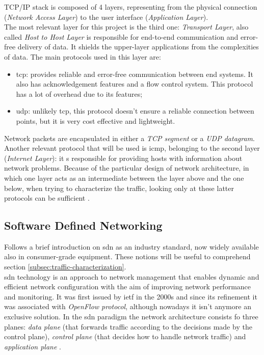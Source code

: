 TCP/IP stack is composed of 4 layers, representing from the physical connection (\textit{Network Access Layer}) to the user interface (\textit{Application Layer}). \\ The most relevant layer for this project is the third one: \textit{Transport Layer}, also called \textit{Host to Host Layer} is responsible for end-to-end communication and error-free delivery of data. It shields the upper-layer applications from the complexities of data. The main protocols used in this layer are:

\begin{itemize}
    \item[\faCaretRight] \gls{tcp}: provides reliable and error-free communication between end systems. It also has acknowledgement features and a flow control system. This protocol has a lot of overhead due to its features;
    \item[\faCaretRight] \gls{udp}: unlikely \gls{tcp}, this protocol doesn't ensure a reliable connection between points, but it is very cost effective and lightweight.
\end{itemize}
Network packets are encapsulated in either a \textit{TCP segment} or a \textit{UDP datagram}. Another relevant protocol that will be used is \gls{icmp}, belonging to the second layer (\textit{Internet Layer}): it s responsible for providing hosts with information about network problems. Because of the particular design of network architecture, in which one layer acts as an intermediate between the layer above and the one below, when trying to characterize the traffic, looking only at these latter protocols can be sufficient \cite{Iglesias2015}.


\subsection{Software Defined Networking}
\label{subsec:sdn}

Follows a brief introduction on \gls{sdn} as an industry standard, now widely available also in consumer-grade equipment. These notions will be useful to comprehend section \ref{subsec:traffic-characterization}. \\
\gls{sdn} technology is an approach to network management that enables dynamic and efficient network configuration with the aim of improving network performance and monitoring. It was first issued by \gls{ietf} in the 2000s and since its refinement it was associated with \textit{OpenFlow protocol}, although nowadays it isn't anymore an exclusive solution. In the \gls{sdn} paradigm the network architecture consists fo three planes: \textit{data plane} (that forwards traffic according to the decisions made by the control plane), \textit{control plane} (that decides how to handle network traffic) and \textit{application plane} \cite{Kreutz2015}.

